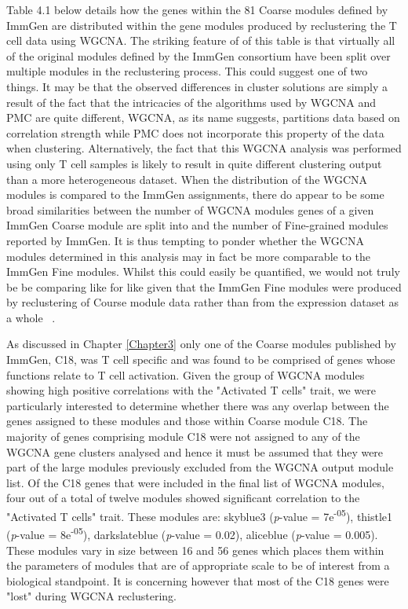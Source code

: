 Table 4.1 below details how the genes within the 81 Coarse modules defined by ImmGen are distributed within the gene modules produced by reclustering the T cell data using WGCNA. The striking feature of of this table is that virtually all of the original modules defined by the ImmGen consortium have been split over multiple modules in the reclustering process. This could suggest one of two things. It may be that the observed differences in cluster solutions are simply a result of the fact that the intricacies of the algorithms used by WGCNA and PMC are quite different, WGCNA, as its name suggests, partitions data based on correlation strength while PMC does not incorporate this property of the data when clustering. Alternatively, the fact that this WGCNA analysis was performed using only T cell samples is likely to result in quite different clustering output than a more heterogeneous dataset. When the distribution of the WGCNA modules is compared to the ImmGen assignments, there do appear to be some broad similarities between the number of WGCNA modules genes of a given ImmGen Coarse module are split into and the number of Fine-grained modules reported by ImmGen. It is thus tempting to ponder whether the WGCNA modules determined in this analysis may in fact be more comparable to the ImmGen Fine modules. Whilst this could easily be quantified, we would not truly be be comparing like for like given that the ImmGen Fine modules were produced by reclustering of Course module data rather than from the expression dataset as a whole ~\autocite{Joj2013}.  

As discussed in Chapter \ref{Chapter3} only one of the Coarse modules published by ImmGen, C18, was T cell specific and was found to be comprised of genes whose functions relate to T cell activation. Given the group of WGCNA modules showing high positive correlations with the "Activated T cells" trait, we were particularly interested to determine whether there was any overlap between the genes assigned to these modules and those within Coarse module C18. The majority of genes comprising module C18 were not assigned to any of the WGCNA gene clusters analysed and hence it must be assumed that they were part of the large modules previously excluded from the WGCNA output module list. Of the C18 genes that were included in the final list of WGCNA modules, four out of a total of twelve modules showed significant correlation to the "Activated T cells" trait. These modules are: skyblue3 (\textit{p}-value = 7e\textsuperscript{-05}), thistle1 (\textit{p}-value = 8e\textsuperscript{-05}), darkslateblue (\textit{p}-value = 0.02), aliceblue (\textit{p}-value = 0.005). These modules vary in size between 16 and 56 genes which places them within the parameters of modules that are of appropriate scale to be of interest from a biological standpoint.  It is concerning however that most of the C18 genes were "lost" during WGCNA reclustering. 

